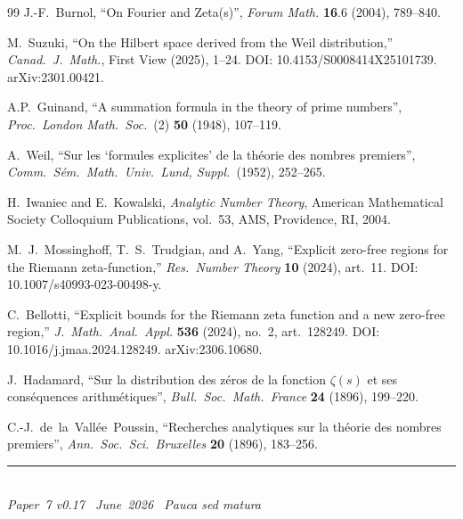 \documentclass[11pt]{article}
\begin{document}
\begin{thebibliography}{99}
J.-F.~Burnol,
``On Fourier and Zeta(s)'',
\emph{Forum Math.} \textbf{16}.6 (2004), 789--840.

M.~Suzuki,
``On the Hilbert space derived from the Weil distribution,''
\textit{Canad.\ J.\ Math.}, First View (2025), 1--24.
DOI: 10.4153/S0008414X25101739.
arXiv:2301.00421.

A.P.~Guinand,
``A summation formula in the theory of prime numbers'',
\emph{Proc.\ London Math.\ Soc.}\ (2) \textbf{50} (1948), 107--119.

A.~Weil,
``Sur les `formules explicites' de la th\'{e}orie des nombres premiers'',
\emph{Comm.\ S\'{e}m.\ Math.\ Univ.\ Lund, Suppl.}\ (1952), 252--265.

H.~Iwaniec and E.~Kowalski,
\emph{Analytic Number Theory},
American Mathematical Society Colloquium Publications,
vol.~53, AMS, Providence, RI, 2004.

M.~J.~Mossinghoff, T.~S.~Trudgian, and A.~Yang,
``Explicit zero-free regions for the Riemann zeta-function,''
\textit{Res.\ Number Theory} \textbf{10} (2024), art.~11.
DOI: 10.1007/s40993-023-00498-y.

C.~Bellotti,
``Explicit bounds for the Riemann zeta function
and a new zero-free region,''
\textit{J.\ Math.\ Anal.\ Appl.} \textbf{536} (2024),
no.~2, art.~128249.
DOI: 10.1016/j.jmaa.2024.128249.
arXiv:2306.10680.

J.~Hadamard,
``Sur la distribution des z\'{e}ros de la fonction $\zeta(s)$
et ses cons\'{e}quences arithm\'{e}tiques'',
\emph{Bull.\ Soc.\ Math.\ France} \textbf{24} (1896), 199--220.

C.-J.~de~la~Vall\'{e}e~Poussin,
``Recherches analytiques sur la th\'{e}orie des nombres premiers'',
\emph{Ann.\ Soc.\ Sci.\ Bruxelles} \textbf{20} (1896), 183--256.

\end{thebibliography}

\enlargethispage{3\baselineskip}
\vspace*{\fill}
\begin{minipage}{\linewidth}
\rule{\linewidth}{0.4pt}\smallskip\\
\small\emph{Paper~7 v0.17 \textperiodcentered\ June~2026
\textperiodcentered\ Pauca sed matura}
\end{minipage}
\end{document}
